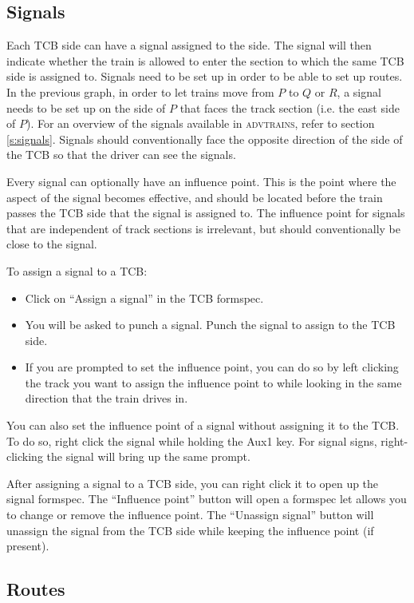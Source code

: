 \documentclass[notitlepage]{article}
\def\advtrains{\textsc{advtrains}}
\begin{document}
\subsection{Signals}\label{s:ilsignals}

Each TCB side can have a signal assigned to the side. The signal will then indicate whether the train is allowed to enter the section to which the same TCB side is assigned to. Signals need to be set up in order to be able to set up routes. In the previous graph, in order to let trains move from $P$ to $Q$ or $R$, a signal needs to be set up on the side of $P$ that faces the track section (i.e. the east side of $P$). For an overview of the signals available in \advtrains, refer to section \ref{s:signals}. Signals should conventionally face the opposite direction of the side of the TCB so that the driver can see the signals.

Every signal can optionally have an influence point. This is the point where the aspect of the signal becomes effective, and should be located before the train passes the TCB side that the signal is assigned to. The influence point for signals that are independent of track sections is irrelevant, but should conventionally be close to the signal.

To assign a signal to a TCB:
\begin{itemize}
\item Click on ``Assign a signal'' in the TCB formspec.
\item You will be asked to punch a signal. Punch the signal to assign to the TCB side.
\item If you are prompted to set the influence point, you can do so by left clicking the track you want to assign the influence point to while looking in the same direction that the train drives in.
\end{itemize}

You can also set the influence point of a signal without assigning it to the TCB. To do so, right click the signal while holding the Aux1 key. For signal signs, right-clicking the signal will bring up the same prompt.

After assigning a signal to a TCB side, you can right click it to open up the signal formspec. The ``Influence point'' button will open a formspec let allows you to change or remove the influence point. The ``Unassign signal'' button will unassign the signal from the TCB side while keeping the influence point (if present).

\subsection{Routes}\label{s:ilroutes}
\end{document}
